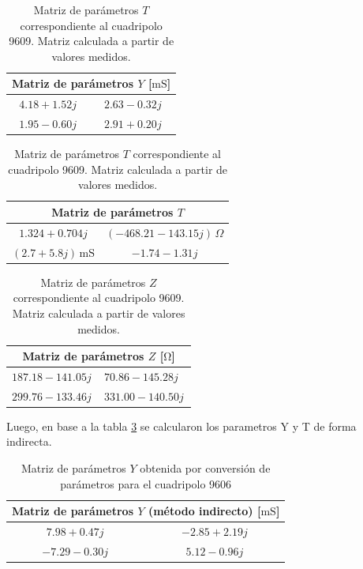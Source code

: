 \begin{table}[H]
\centering
\begin{minipage}{0.48\textwidth}
\centering
\begin{tabular}{|c|c|}
\hline
\multicolumn{2}{|c|}{\textbf{Matriz de parámetros $Y$ [$\mathrm{mS}$]}} \\ \hline
$4.18 + 1.52j\,$ & $2.63 - 0.32j\,$ \\ \hline
$1.95 - 0.60j\,$ & $2.91 + 0.20j\,$ \\ \hline
\end{tabular}
\caption{Matriz de parámetros $Y$ correspondiente al cuadripolo 9609. Matriz calculada a partir de valores medidos.}
\label{tab:matriz_Y_9609}
\end{minipage}
\hfill
\begin{minipage}{0.48\textwidth}
\centering
\begin{tabular}{|c|c|}
\hline
\multicolumn{2}{|c|}{\textbf{Matriz de parámetros $T$}} \\ \hline
$1.324 + 0.704j$ & $(-468.21 - 143.15j)\,\Omega$ \\ \hline
$(2.7 + 5.8j)\,\mathrm{mS}$ & $-1.74 - 1.31j$ \\ \hline
\end{tabular}
\caption{Matriz de parámetros $T$ correspondiente al cuadripolo 9609. Matriz calculada a partir de valores medidos.}
\label{tab:matriz_T_9609}
\end{minipage}
\end{table}

\begin{table}[H]
\centering
\begin{tabular}{|l|l|}
\hline
\multicolumn{2}{|c|}{\textbf{Matriz de parámetros $Z$ [$\mathrm{\Omega}$]}} \\ \hline
$187.18 - 141.05j\,$ & $70.86 - 145.28j\,$ \\ \hline
$299.76 - 133.46j\, $ & $331.00 - 140.50j\,$ \\ \hline
\end{tabular}
\caption{Matriz de parámetros $Z$ correspondiente al cuadripolo 9609. Matriz calculada a partir de valores medidos.}
\label{tab:matriz_Z9609}
\end{table}

Luego, en base a la tabla \ref{tab:matriz_Z9609} se calcularon los parametros Y y T de forma indirecta.
	
	\begin{table}[H]
\centering
\begin{tabular}{|c|c|}
\hline
\multicolumn{2}{|c|}{\textbf{Matriz de parámetros $Y$ (método indirecto) [$\mathrm{mS}$]}} \\ \hline
$7.98 + 0.47j\,$ & $-2.85 + 2.19j\,$ \\ \hline
$-7.29 - 0.30j\,$ & $5.12 - 0.96j\,$ \\ \hline
\end{tabular}
\caption{Matriz de parámetros $Y$ obtenida por conversión de parámetros para el cuadripolo 9606}
\label{tab:matriz_Y9606_indirecta}
\end{table}

